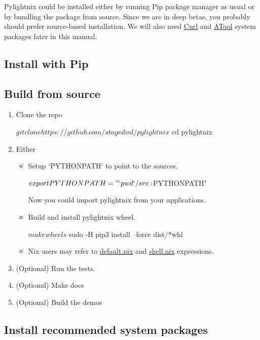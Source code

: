 \documentclass{article}
\begin{document}
Pylightnix could be installed either by running Pip package manager as usual or
by bundling the package from source. Since we are in deep betas, you probably
should prefer source-based installation. We will also need
\href{https://curl.se/}{Curl} and \href{https://www.nongnu.org/atool/}{ATool}
system packages later in this manual.

\subsection{Install with Pip}


\subsection{Build from source}

\begin{enumerate}
\item Clone the repo
  \begin{shellcode}
  $ git clone https://github.com/stagedml/pylightnix
  $ cd pylightnix
  \end{shellcode}
\item Either
  \begin{itemize}
    \item Setup `PYTHONPATH` to point to the sources.
      \begin{shellcode}
      $ export PYTHONPATH="`pwd`/src:$PYTHONPATH"
      \end{shellcode}
      Now you could import pylightnix from your applications.
    \item Build and install pylightnix wheel.
      \begin{shellcode}
      $ make wheels
      $ sudo -H pip3 install --force dist/*whl
      \end{shellcode}
    \item Nix users may refer to \href{../default.nix}{default.nix} and
      \href{../shell.nix}{shell.nix} expressions.
  \end{itemize}
\item (Optional) Run the tests.
\item (Optional) Make docs
\item (Optional) Build the demos
\end{enumerate}

\subsection{Install recommended system packages}
\end{document}
